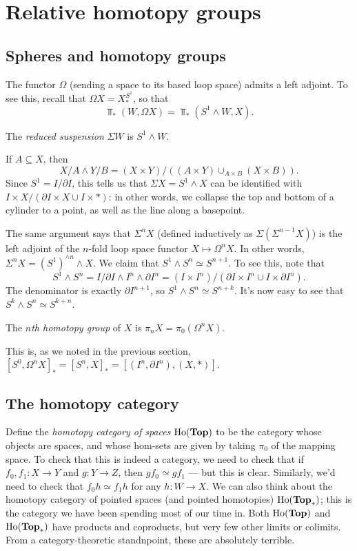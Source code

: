 \section{Relative homotopy groups}
\subsection{Spheres and homotopy groups}
The functor $\Omega$ (sending a space to its based loop space) admits a left adjoint.
To see this, recall that $\Omega X = X^{S^1}_\ast$, so that
$$\Top_\ast(W,\Omega X) = \Top_\ast(S^1\wedge W,X).$$
\begin{definition}
    The \emph{reduced suspension} $\Sigma W$ is $S^1\wedge W$.
\end{definition}
If $A\subseteq X$, then
$$X/A\wedge Y/B = (X\times Y)/((A\times Y)\cup_{A\times B}(X\times B)).$$
Since $S^1 = I/\partial I$, this tells us that $\Sigma X = S^1\wedge X$ can be identified with
$I\times X/(\partial I \times X\cup I\times \ast)$: in other words, we collapse the top and bottom of a cylinder to a point,
as well as the line along a basepoint.

The same argument says that $\Sigma^n X$ (defined inductively as $\Sigma(\Sigma^{n-1} X)$)
is the left adjoint of the $n$-fold loop space functor $X\mapsto \Omega^n X$.
In other words, $\Sigma^n X = (S^1)^{\wedge n}\wedge X$.
We claim that $S^1\wedge S^n \simeq S^{n+1}$.
To see this, note that
$$S^1\wedge S^n = I/\partial I\wedge I^n\wedge \partial I^n = (I\times I^n)/(\partial I\times I^n\cup I\times \partial I^n).$$
The denominator is exactly $\partial I^{n+1}$, so $S^1\wedge S^n\simeq S^{n+k}$.
It's now easy to see that $S^k\wedge S^n\simeq S^{k+n}$.
\begin{definition}
    The \emph{$n$th homotopy group} of $X$ is $\pi_n X = \pi_0(\Omega^n X)$.
\end{definition}
This is, as we noted in the previous section, $[S^0,\Omega^n X]_\ast = [S^n, X]_\ast = [(I^n,\partial I^n),(X,\ast)]$.

\subsection{The homotopy category}
Define the \emph{homotopy category of spaces} $\mathrm{Ho}(\mathbf{Top})$ to be the category
whose objects are spaces, and whose hom-sets are given by taking $\pi_0$ of the mapping space.
To check that this is indeed a category, we need to check that if $f_0,f_1:X\to Y$ and $g:Y\to Z$, then $gf_0\simeq gf_1$ ---
but this is clear.
Similarly, we'd need to check that $f_0h\simeq f_1h$ for any $h:W\to X$.
We can also think about the homotopy category of pointed spaces (and pointed homotopies) $\mathrm{Ho}(\mathbf{Top}_\ast)$; this is the category
we have been spending most of our time in.
Both $\mathrm{Ho}(\mathbf{Top})$ and $\mathrm{Ho}(\mathbf{Top}_\ast)$ have products and coproducts, but very few other limits or colimits.
From a category-theoretic standnpoint, these are absolutely terrible.

